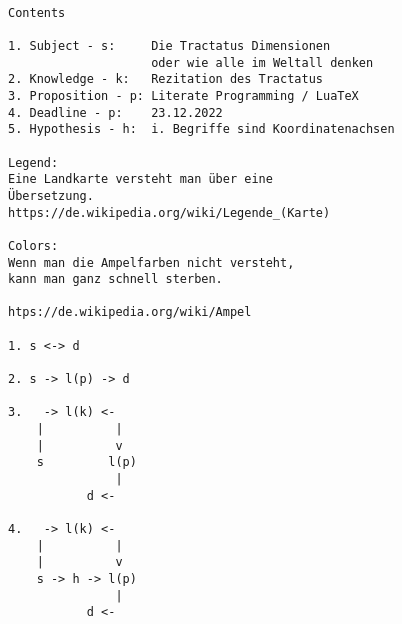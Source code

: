 \documentclass[10pt,a4paper]{article}
\begin{document}
\begin{verbatim}

Contents

1. Subject - s:     Die Tractatus Dimensionen
                    oder wie alle im Weltall denken
2. Knowledge - k:   Rezitation des Tractatus
3. Proposition - p: Literate Programming / LuaTeX
4. Deadline - p:    23.12.2022
5. Hypothesis - h:  i. Begriffe sind Koordinatenachsen

Legend:
Eine Landkarte versteht man über eine
Übersetzung.
https://de.wikipedia.org/wiki/Legende_(Karte)

Colors:
Wenn man die Ampelfarben nicht versteht,
kann man ganz schnell sterben.

htps://de.wikipedia.org/wiki/Ampel

1. s <-> d

2. s -> l(p) -> d

3.   -> l(k) <-
    |          |
    |          v
    s         l(p)
               |
           d <-

4.   -> l(k) <-
    |          |
    |          v
    s -> h -> l(p)
               |
           d <-

\end{verbatim}
\end{document}
